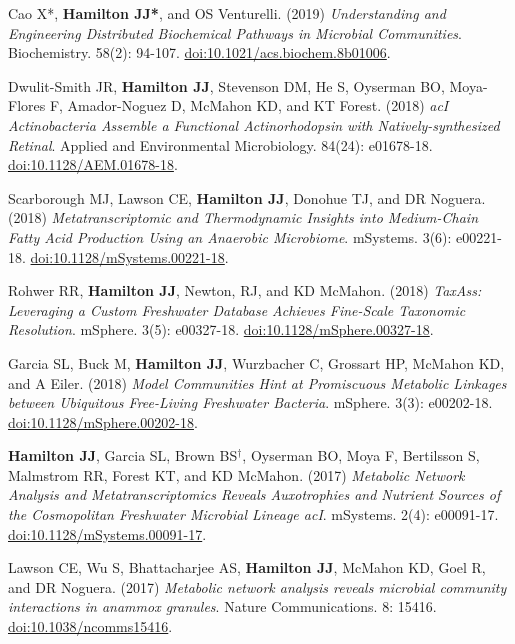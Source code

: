 \documentclass[letterpaper,11pt]{article}
\newlength{\outerbordwidth}
\newcommand{\resheading}[1]{\vspace{8pt}
  \parbox{\textwidth}{
  \setlength{\FrameSep}{\outerbordwidth}
\setlength{\fboxsep}{0pt}
\framebox[\textwidth][l]{\setlength{\fboxsep}{4pt}\fcolorbox{shadecolorB}{shadecolorB}{\textbf{\sffamily{\mbox{~}\makebox[6.262in][l]{\large #1} \vphantom{p\^{E}}}}}}
  }
  \vspace{-5pt}
}
\begin{document}

\resheading{Publications}
\begin{etaremune}[itemsep=-2pt]
	\item Cao X*, \textbf{Hamilton JJ*}, and OS Venturelli. (2019) \emph{Understanding and Engineering Distributed Biochemical Pathways in Microbial Communities}. Biochemistry. 58(2): 94-107. \href{https://doi.org/10.1021/acs.biochem.8b01006}{doi:10.1021/acs.biochem.8b01006}.
	\item Dwulit-Smith JR, \textbf{Hamilton JJ}, Stevenson DM, He S, Oyserman BO, Moya-Flores F, Amador-Noguez D, McMahon KD, and KT Forest. (2018) \emph{acI Actinobacteria Assemble a Functional Actinorhodopsin with Natively-synthesized Retinal}. Applied and Environmental Microbiology. 84(24): e01678-18. \href{https://doi.org/10.1128/AEM.01678-18}{doi:10.1128/AEM.01678-18}.
	\item Scarborough MJ, Lawson CE, \textbf{Hamilton JJ}, Donohue TJ, and DR Noguera. (2018) \emph{Metatranscriptomic and Thermodynamic Insights into Medium-Chain Fatty Acid Production Using an Anaerobic Microbiome}. mSystems. 3(6): e00221-18. \href{https://doi.org/10.1128/mSystems.00221-18}{doi:10.1128/mSystems.00221-18}.
	\item Rohwer RR, \textbf{Hamilton JJ}, Newton, RJ, and KD McMahon. (2018) \emph{TaxAss: Leveraging a Custom Freshwater Database Achieves Fine-Scale Taxonomic Resolution}. mSphere. 3(5): e00327-18. \href{https://doi.org/10.1128/mSphere.00327-18}{doi:10.1128/mSphere.00327-18}.
	\item Garcia SL, Buck M, \textbf{Hamilton JJ}, Wurzbacher C, Grossart HP, McMahon KD, and A Eiler. (2018) \emph{Model Communities Hint at Promiscuous Metabolic Linkages between Ubiquitous Free-Living Freshwater Bacteria}. mSphere. 3(3): e00202-18. \href{https://doi.org/10.1128/mSphere.00202-18}{doi:10.1128/mSphere.00202-18}.
	\item \textbf{Hamilton JJ}, Garcia SL, Brown BS$^\dagger$, Oyserman BO, Moya F, Bertilsson S, Malmstrom RR, Forest KT, and KD McMahon. (2017) \emph{Metabolic Network Analysis and Metatranscriptomics Reveals Auxotrophies and Nutrient Sources of the Cosmopolitan Freshwater Microbial Lineage acI}. mSystems. 2(4): e00091-17. \href{https://doi.org/10.1128/mSystems.00091-17}{doi:10.1128/mSystems.00091-17}.
	\item Lawson CE, Wu S, Bhattacharjee AS, \textbf{Hamilton JJ}, McMahon KD, Goel R, and DR Noguera. (2017) \emph{Metabolic network analysis reveals microbial community interactions in anammox granules}. Nature Communications. 8: 15416. \href{https://www.nature.com/articles/ncomms15416}{doi:10.1038/ncomms15416}.

\end{etaremune}
\end{document}
